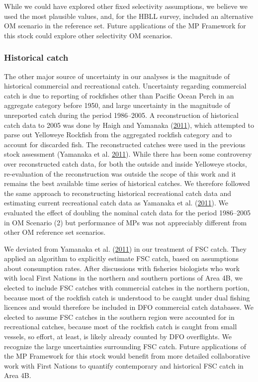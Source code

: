 \documentclass[11pt]{book}
\begin{document}
While we could have explored other fixed selectivity assumptions, we believe we used the most plausible values, and, for the HBLL survey, included an alternative OM scenario in the reference set. Future applications of the MP Framework for this stock could explore other selectivity OM scenarios.

\hypertarget{sec:discussion-uncertainties-catch}{%
\subsubsection{Historical catch}\label{sec:discussion-uncertainties-catch}}

The other major source of uncertainty in our analyses is the magnitude of historical commercial and recreational catch. Uncertainty regarding commercial catch is due to reporting of rockfishes other than Pacific Ocean Perch in an aggregate category before 1950, and large uncertainty in the magnitude of unreported catch during the period 1986--2005. A reconstruction of historical catch data to 2005 was done by Haigh and Yamanaka (\protect\hyperlink{ref-haigh2011}{2011}), which attempted to parse out Yelloweye Rockfish from the aggregated rockfish category and to account for discarded fish. The reconstructed catches were used in the previous stock assessment (Yamanaka et al. \protect\hyperlink{ref-yamanaka2011}{2011}). While there has been some controversy over reconstructed catch data, for both the outside and inside Yelloweye stocks, re-evaluation of the reconstruction was outside the scope of this work and it remains the best available time series of historical catches. We therefore followed the same approach to reconstructing historical recreational catch data and estimating current recreational catch data as Yamanaka et al. (\protect\hyperlink{ref-yamanaka2011}{2011}). We evaluated the effect of doubling the nominal catch data for the period 1986--2005 in OM Scenario (2) but performance of MPs was not appreciably different from other OM reference set scenarios.

We deviated from Yamanaka et al. (\protect\hyperlink{ref-yamanaka2011}{2011}) in our treatment of FSC catch. They applied an algorithm to explicitly estimate FSC catch, based on assumptions about consumption rates. After discussions with fisheries biologists who work with local First Nations in the northern and southern portions of Area 4B, we elected to include FSC catches with commercial catches in the northern portion, because most of the rockfish catch is understood to be caught under dual fishing licences and would therefore be included in DFO commercial catch databases. We elected to assume FSC catches in the southern region were accounted for in recreational catches, because most of the rockfish catch is caught from small vessels, so effort, at least, is likely already counted by DFO overflights. We recognize the large uncertainties surrounding FSC catch. Future applications of the MP Framework for this stock would benefit from more detailed collaborative work with First Nations to quantify contemporary and historical FSC catch in Area 4B.
\end{document}
